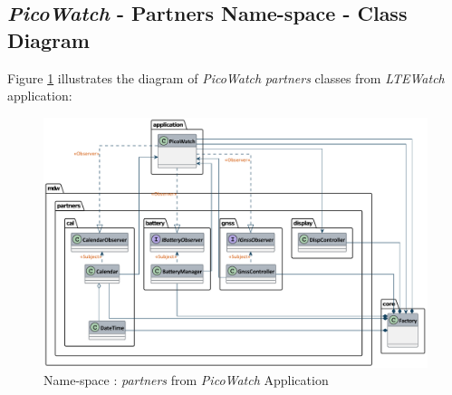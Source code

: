 \documentclass[report.tex]{subfiles}
\begin{document}
\begin{landscape}

\subsection{\textit{PicoWatch} - Partners Name-space - Class Diagram}

Figure \ref{fig:picoWatchPartner} illustrates the diagram of \textit{PicoWatch} \textit{partners} classes from \textit{LTEWatch} application: 


\begin{figure}[H]
	\centering
	\includegraphics[width=1.25\textwidth]{Include/Figure/software/class/picoWatchPartner.pdf}
	\caption{Name-space : \textit{partners} from \textit{PicoWatch} Application}
	\label{fig:picoWatchPartner}
\end{figure}
\end{landscape}
\end{document}
